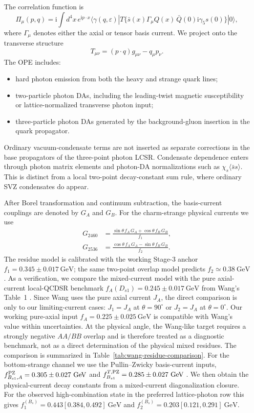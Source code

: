 \documentclass[11pt]{article}
\newcommand{\ii}{\mathrm{i}}
\newcommand{\Bsone}{B_{s1}}
\newcommand{\GeV}{\mathrm{GeV}}
\newcommand{\ssbar}{\langle\bar s s\rangle}
\begin{document}
The correlation function is
\begin{equation}
  \Pi_\mu(p,q)=\ii\int d^4x\,e^{\ii p\cdot x}
  \langle\gamma(q,\varepsilon)|
  T\{\bar s(x)\Gamma_\mu Q(x)\,\bar Q(0)\ii\gamma_5 s(0)\}
  |0\rangle ,
  \label{eq:corr}
\end{equation}
where $\Gamma_\mu$ denotes either the axial or tensor basis current.  We
project onto the transverse structure
\begin{equation}
  T_{\mu\nu}=(p\cdot q)g_{\mu\nu}-q_\mu p_\nu .
\end{equation}
The OPE includes:
\begin{itemize}
  \item hard photon emission from both the heavy and strange quark lines;
  \item two-particle photon DAs, including the leading-twist magnetic
  susceptibility or lattice-normalized transverse photon input;
  \item three-particle photon DAs generated by the background-gluon insertion
  in the quark propagator.
\end{itemize}
Ordinary vacuum-condensate terms are not inserted as separate corrections in
the base propagators of the three-point photon LCSR.  Condensate dependence
enters through photon matrix elements and photon-DA normalizations such as
$\chi_s\ssbar$.  This is distinct from a local two-point decay-constant sum
rule, where ordinary SVZ condensates do appear.

After Borel transformation and continuum subtraction, the basis-current
couplings are denoted by $G_A$ and $G_B$.  For the charm-strange physical
currents we use
\begin{align}
  G_{2460} &=
  \frac{\sin\theta\,f_A\,G_A+\cos\theta\,f_B\,G_B}{f_1},\\
  G_{2536} &=
  \frac{\cos\theta\,f_A\,G_A-\sin\theta\,f_B\,G_B}{f_2}.
  \label{eq:stage3}
\end{align}
The residue model is calibrated with the working Stage-3 anchor
$f_1=0.345\pm0.017~\GeV$; the same two-point overlap model predicts
$f_2\simeq0.38~\GeV$.  As a verification, we compare the mixed-current model
with the pure axial-current local-QCDSR benchmark
$f_A(D_{s1})=0.245\pm0.017~\GeV$ from Wang's Table~1 \cite{Wang2015}.  Since
Wang uses the pure axial current $J_A$, the direct comparison is only to our
limiting-current cases: $J_1=J_A$ at $\theta=90^\circ$ or $J_2=J_A$ at
$\theta=0^\circ$.  Our working pure-axial input
$f_A=0.225\pm0.025~\GeV$ is compatible with Wang's value within uncertainties.
At the physical angle, the Wang-like target requires a strongly negative
$AA/BB$ overlap and is therefore treated as a diagnostic benchmark, not as a
direct determination of the physical mixed residues.  The comparison is
summarized in Table~\ref{tab:wang-residue-comparison}.
For the bottom-strange channel we use the Pullin--Zwicky basis-current inputs,
$f_{\Bsone,A}^{\rm PZ}=0.305\pm0.027~\GeV$ and
$f_{\Bsone}^{T,\rm PZ}=0.285\pm0.027~\GeV$ \cite{PullinZwicky2021}.  We then
obtain the physical-current decay constants from a mixed-current
diagonalization closure.  For the observed high-combination state in the
preferred lattice-photon row this gives
$f_1^{(B_s)}=0.443[0.384,0.492]~\GeV$ and
$f_2^{(B_s)}=0.203[0.121,0.291]~\GeV$.
\end{document}
